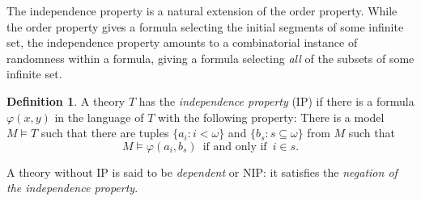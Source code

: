 \documentclass{article}
\newcommand{\vphi}{\varphi}
\theoremstyle{definition}
\newtheorem{definition}{Definition}
\theoremstyle{definition}
\theoremstyle{definition}
\begin{document}
\begin{center}
\end{center}




The independence property is a natural extension of the order property. While the order property gives a formula selecting the initial segments of some infinite set, the independence property amounts to a combinatorial instance of randomness within a formula, giving a formula selecting \textit{all} of the subsets of some infinite set.


\begin{definition}
A theory $T$ has the \textit{independence property} (IP) if there is a formula $\vphi(x, y)$ in the language of $T$ with the following property: There is a model $M\models T$ such that there are tuples $\{a_i\colon i< \omega\}$ and $\{b_{s}\colon s\subseteq \omega\}$ from $M$ such that \[M\models \vphi(a_i, b_{s})\enspace\text{if and only if} \enspace i\in s.\] 

A theory without $\mathrm{IP}$ is said to be \textit{dependent} or $\mathrm{NIP}$: it satisfies the \textit{negation of the independence property}.






\end{definition}
\end{document}
